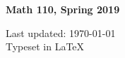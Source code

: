 \documentclass[11pt,letterpaper]{scrartcl}
\theoremstyle{definition}
\begin{document}
\centerline{\huge \textbf{Math 110, Spring 2019}} 
\vskip 0.6cm
\thispagestyle{empty}
\tableofcontents
\newpage
 \vfill
 \vfill
\begin{center}
    Last updated: \today \\ Typeset in \LaTeX
\end{center}
\end{document}
